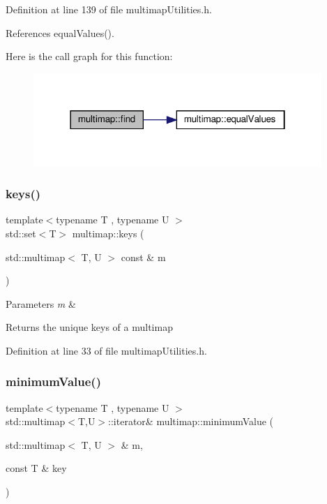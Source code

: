 Definition at line 139 of file multimap\+Utilities.\+h.



References equal\+Values().

Here is the call graph for this function\+:\nopagebreak
\begin{figure}[H]
\begin{center}
\leavevmode
\includegraphics[width=310pt]{namespacemultimap_ad8171701d0a623e4623721cb1743196c_cgraph}
\end{center}
\end{figure}
\mbox{\label{namespacemultimap_a1d03380ed2365e307412efab3c41731f}} 
\subsubsection{\texorpdfstring{keys()}{keys()}}
{\footnotesize\ttfamily template$<$typename T , typename U $>$ \\
std\+::set$<$T$>$ multimap\+::keys (\begin{DoxyParamCaption}\item[{std\+::multimap$<$ T, U $>$ const \&}]{m }\end{DoxyParamCaption})}


\begin{DoxyParams}{Parameters}
{\em m} & \\
\hline
\end{DoxyParams}
\begin{DoxyReturn}{Returns}
the unique keys of a multimap 
\end{DoxyReturn}


Definition at line 33 of file multimap\+Utilities.\+h.

\mbox{\label{namespacemultimap_a94c77f5e6ac9c4eaeb34a6c142b6ab0d}} 
\subsubsection{\texorpdfstring{minimum\+Value()}{minimumValue()}}
{\footnotesize\ttfamily template$<$typename T , typename U $>$ \\
std\+::multimap$<$T,U$>$\+::iterator\& multimap\+::minimum\+Value (\begin{DoxyParamCaption}\item[{std\+::multimap$<$ T, U $>$ \&}]{m,  }\item[{const T \&}]{key }\end{DoxyParamCaption})}


